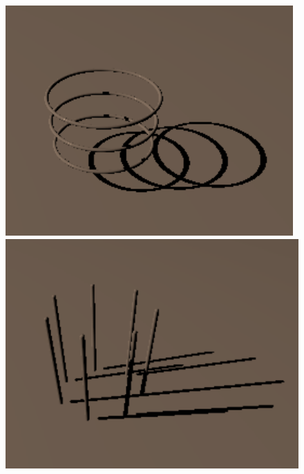 \documentclass[aspectratio=169]{ctexbeamer} %
\begin{document}
\begin{frame}
\begin{figure}[htbp]
        \includegraphics[height=.33\textheight]{images/pre/cone/rings.pdf}
        \includegraphics[height=.33\textheight]{images/pre/cone/bars.pdf}
        \caption{}
        \label{fig:cone_parts}
    \end{figure}
\end{frame}
\end{document}
